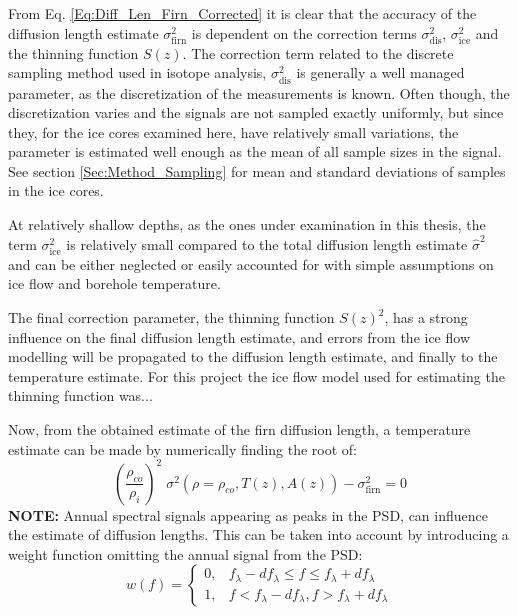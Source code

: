 \documentclass[../../CompleteThesis/Complete_1stDraft.tex]{subfiles}
\begin{document}
From Eq. \ref{Eq:Diff_Len_Firn_Corrected} it is clear that the accuracy of the diffusion length estimate $\sigma_{\text{firn}}^2$ is dependent on the correction terms $\sigma_{\text{dis}}^2$, $\sigma_{\text{ice}}^2$ and the thinning function $S(z)$. The correction term related to the discrete sampling method used in isotope analysis, $\sigma_{\text{dis}}^2$ is generally a well managed parameter, as the discretization of the measurements is known. Often though, the discretization varies and the signals are not sampled exactly uniformly, but since they, for the ice cores examined here, have relatively small variations, the parameter is estimated well enough as the mean of all sample sizes in the signal. See section \ref{Sec:Method_Sampling} for mean and standard deviations of samples in the ice cores.

At relatively shallow depths, as the ones under examination in this thesis, the term $\sigma_{\text{ice}}^2$ is relatively small compared to the total diffusion length estimate $\hat{\sigma}^2$ and can be either neglected or easily accounted for with simple assumptions on ice flow and borehole temperature. 

The final correction parameter, the thinning function $S(z)^2$, has a strong influence on the final diffusion length estimate, and errors from the ice flow modelling will be propagated to the diffusion length estimate, and finally to the temperature estimate. For this project the ice flow model used for estimating the thinning function was...

Now, from the obtained estimate of the firn diffusion length, a temperature estimate can be made by numerically finding the root of:
\begin{equation}
	\left(\frac{\rho_{co}}{\rho_i}\right)^2\;\sigma^2(\rho=\rho_{co}, T(z),A(z)) - \sigma_{\text{firn}}^2 = 0
	\label{Eq:Firn_Temp_est_Roots}
\end{equation}
\textbf{NOTE:} Annual spectral signals appearing as peaks in the PSD, can influence the  estimate of diffusion lengths. This can be taken into account by introducing a weight function omitting the annual signal from the PSD:
\begin{equation}
	w(f) = \begin{cases}
		0, & f_{\lambda} - d f_{\lambda} \leq f \leq f_{\lambda} + d f_{\lambda} \\
		1, & f < f_{\lambda} - d f_{\lambda}, f > f_{\lambda} + d f_{\lambda}
	\end{cases}
\end{equation}
\end{document}
